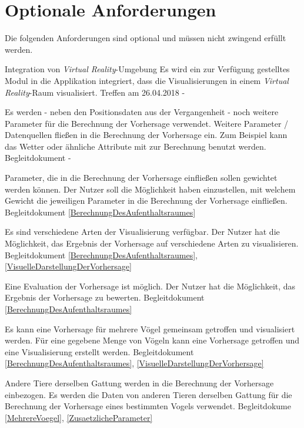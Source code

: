 \documentclass[12pt]{article} %
\begin{document}
 \section{Optionale Anforderungen} \label{optionale_anforderungen}

 Die folgenden Anforderungen sind optional und müssen nicht zwingend erfüllt werden.

\begin{requirements}[ref={(O\arabic*)},label=(O\arabic*)]
{
 Integration von \textit{Virtual Reality}-Umgebung
 }{
 Es wird ein zur Verfügung gestelltes Modul in die Applikation integriert, dass die Visualisierungen in einem \textit{Virtual Reality}-Raum visualisiert. 
 }{
 Treffen am 26.04.2018 
 }{
 - 
}

{
 Es werden - neben den Positionsdaten aus der Vergangenheit - noch weitere Parameter für die Berechnung der Vorhersage verwendet. 
 }{
 Weitere Parameter / Datenquellen fließen in die Berechnung der Vorhersage ein. Zum Beispiel kann das Wetter oder ähnliche Attribute mit zur Berechnung benutzt werden.
 }{
 Begleitdokument 
 }{
 - 
}

{
 Parameter, die in die Berechnung der Vorhersage einfließen sollen gewichtet werden können. 
 }{
 Der Nutzer soll die Möglichkeit haben einzustellen, mit welchem Gewicht die jeweiligen Parameter in die Berechnung der Vorhersage einfließen.
 }{
 Begleitdokument 
 }{
 \ref{BerechnungDesAufenthaltsraumes} 
}

{
 Es sind verschiedene Arten der Visualisierung verfügbar. 
 }{
 Der Nutzer hat die Möglichkeit, das Ergebnis der Vorhersage auf verschiedene Arten zu visualisieren. 
 }{
 Begleitdokument 
 }{
 \ref{BerechnungDesAufenthaltsraumes}, \ref{VisuelleDarstellungDerVorhersage} 
}

{
 Eine Evaluation der Vorhersage ist möglich. 
 }{
 Der Nutzer hat die Möglichkeit, das Ergebnis der Vorhersage zu bewerten. 
 }{
 Begleitdokument 
 }{
 \ref{BerechnungDesAufenthaltsraumes} 
}

{
 Es kann eine Vorhersage für mehrere Vögel gemeinsam getroffen und visualisiert werden. 
 }{
 Für eine gegebene Menge von Vögeln kann eine Vorhersage getroffen und eine Visualisierung erstellt werden. 
 }{
 Begleitdokument 
 }{
 \ref{BerechnungDesAufenthaltsraumes}, \ref{VisuelleDarstellungDerVorhersage} 
}

{
 Andere Tiere derselben Gattung werden in die Berechnung der Vorhersage einbezogen. 
 }{
 Es werden die Daten von anderen Tieren derselben Gattung für die Berechnung der Vorhersage eines bestimmten Vogels verwendet. 
 }{
 Begleitdokume
 }{
 \ref{MehrereVoegel}, \ref{ZusaetzlicheParameter} 
}


\end{requirements}
\end{document}
